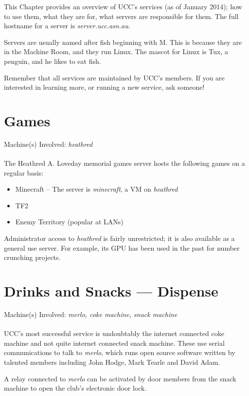 
\newcommand{\server}[1]{\emph{#1}}

\null
This Chapter provides an overview of UCC's services (as of January 2014); how to use them, what they are for, what servers are responsible for them. The full hostname for a server is \server{server.ucc.asn.au}.

 Servers are usually named after fish beginning with M. This is because they are in the Machine Room, and they run Linux. The mascot for Linux is Tux, a penguin, and he likes to eat fish.


Remember that all services are maintained by UCC's members. If you are interested in learning more, or running a new service, ask someone!



\newenvironment{uccservice}[2]
{
	\begin{minipage}{\textwidth}
	\section{#1}
	Machine(s) Involved: \server{#2}\\
	\\
}{
\end{minipage}
}

\begin{uccservice}{Games}{heathred}
The Heathred A. Loveday memorial games server hosts the following games on a regular basis:
\begin{itemize}
	\item Minecraft -- The server is \server{minecraft}, a VM on \server{heathred}
	\item TF2
	\item Enemy Territory (popular at LANs)
\end{itemize}

Administrator access to \server{heathred} is fairly unrestricted; it is also available as a general use server. For example, its GPU has been used in the past for number crunching projects.
\end{uccservice}

\begin{uccservice}{Drinks and Snacks --- Dispense}{merlo, coke machine, snack machine}
UCC's most successful service is undoubtably the internet connected coke machine and not quite internet connected snack machine. These use serial communications to talk to \server{merlo}, which runs open source software written by talented members including John Hodge, Mark Tearle and David Adam. 

A relay connected to \server{merlo} can be activated by door members from the snack machine to open the club's electronic door lock.
\end{uccservice}

